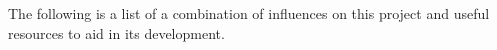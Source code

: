 

The following is a list of a combination of influences on this project and useful resources to aid in its development.


%



\StopChapter

